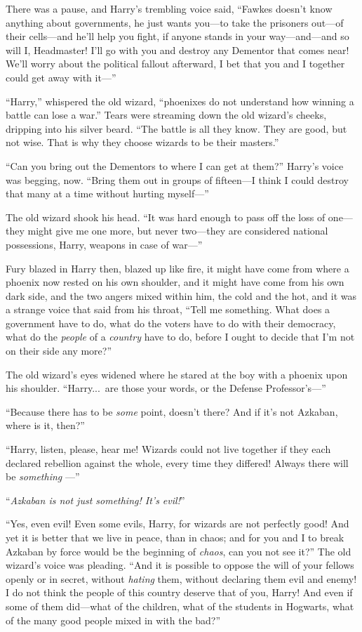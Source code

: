 There was a pause, and Harry’s trembling voice said, “Fawkes doesn’t know anything about governments, he just wants you—to take the prisoners out—of their cells—and he’ll help you fight, if anyone stands in your way—and—and so will I, Headmaster! I’ll go with you and destroy any Dementor that comes near! We’ll worry about the political fallout afterward, I bet that you and I together could get away with it—”

“Harry,” whispered the old wizard, “phoenixes do not understand how winning a battle can lose a war.” Tears were streaming down the old wizard’s cheeks, dripping into his silver beard. “The battle is all they know. They are good, but not wise. That is why they choose wizards to be their masters.”

“Can you bring out the Dementors to where I can get at them?” Harry’s voice was begging, now. “Bring them out in groups of fifteen—I think I could destroy that many at a time without hurting myself—”

The old wizard shook his head. “It was hard enough to pass off the loss of one—they might give me one more, but never two—they are considered national possessions, Harry, weapons in case of war—”

Fury blazed in Harry then, blazed up like fire, it might have come from where a phoenix now rested on his own shoulder, and it might have come from his own dark side, and the two angers mixed within him, the cold and the hot, and it was a strange voice that said from his throat, “Tell me something. What does a government have to do, what do the voters have to do with their democracy, what do the \emph{people} of a \emph{country} have to do, before I ought to decide that I’m not on their side any more?”

The old wizard’s eyes widened where he stared at the boy with a phoenix upon his shoulder. “Harry...\ are those your words, or the Defense Professor’s—”

“Because there has to be \emph{some} point, doesn’t there? And if it’s not Azkaban, where is it, then?”

“Harry, listen, please, hear me! Wizards could not live together if they each declared rebellion against the whole, every time they differed! Always there will be \emph{something} —”

“\emph{Azkaban is not just something! It’s evil!}”

“Yes, even evil! Even some evils, Harry, for wizards are not perfectly good! And yet it is better that we live in peace, than in chaos; and for you and I to break Azkaban by force would be the beginning of \emph{chaos}, can you not see it?” The old wizard’s voice was pleading. “And it is possible to oppose the will of your fellows openly or in secret, without \emph{hating} them, without declaring them evil and enemy! I do not think the people of this country deserve that of you, Harry! And even if some of them did—what of the children, what of the students in Hogwarts, what of the many good people mixed in with the bad?”

